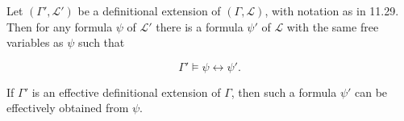 Let $(\Gamma', \mathcal{L}')$ be a definitional extension of $(\Gamma, \mathcal{L})$, with notation as in 11.29. Then for any formula $\psi$ of $\mathcal{L}'$ there is a formula $\psi'$ of $\mathcal{L}$ with the same free variables as $\psi$ such that

$$\Gamma' \models \psi \leftrightarrow \psi'.$$

If $\Gamma'$ is an effective definitional extension of $\Gamma$, then such a formula $\psi'$ can be effectively obtained from $\psi$.
